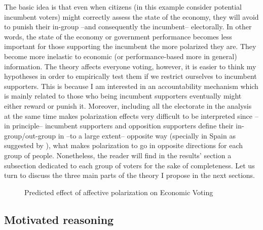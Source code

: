 \documentclass[a4paper, svgnames]{article}
\begin{document}
The basic idea is that even when citizens (in this example consider potential incumbent voters) might correctly assess the state of the economy, they will avoid to punish their in-group --and consequently the incumbent-- electorally. In other words, the state of the economy or government performance becomes less important for those supporting the incumbent the more polarized they are. They become more inelastic to economic (or performance-based more in general) information. The theory affects everyone voting, however, it is easier to think my hypotheses in order to empirically test them if we restrict ourselves to incumbent supporters. This is because I am interested in an accountability mechanism which is mainly related to those who being incumbent supporters eventually might either reward or punish it. Moreover, including all the electorate in the analysis at the same time makes polarization effects very difficult to be interpreted since --in principle-- incumbent supporters and opposition supporters define their in-group/out-group in --to a large extent-- opposite way (specially in Spain as suggested by \citet*{Orriols2020}), what makes polarization to go in opposite directions for each group of people. Nonetheless, the reader will find in the results' section a subsection dedicated to each group of voters for the sake of completeness. Let us turn to discuss the three main parts of the theory I propose in the next sections.

\begin{figure}[H]
	\centering
	\caption{\label{fig:model} Predicted effect of affective polarization on Economic Voting}
\end{figure}

\subsection{Motivated reasoning}
\end{document}
